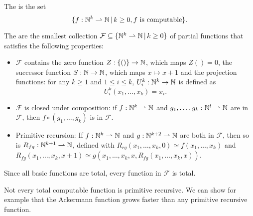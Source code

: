 
\begin{definition}
  The  is the set
  \[
	\{f: \mathbb{N}^k \rightharpoonup \mathbb{N} \,|\, k \ge 0, \text{$f$ is computable}\}.
  \]
\end{definition}

\begin{definition}
  The  are the smallest collection
  $\mathcal{F} \subseteq \{\mathbb{N}^k \rightharpoonup \mathbb{N} \,|\, k \ge 0\}$ of partial
  functions that satisfies the following properties:
  \begin{itemize}
  \item $\mathcal{F}$ contains the zero function $Z: \{()\} \to \mathbb{N}$,
	which maps $Z() = 0$, the successor function $S: \mathbb{N} \to \mathbb{N}$, which maps $x
	\mapsto x+1$ and the projection functions:
	for any $k \ge 1$ and $1 \le i \le k$, $U_i^k: \mathbb{N}^k \to \mathbb{N}$ is defined as
	\[
	  U_i^k(x_1, \ldots, x_k) = x_i.
	\]
  \item $\mathcal{F}$ is closed under composition: if $f: \mathbb{N}^k \rightharpoonup
	\mathbb{N}$ and $g_1, \ldots, g_k: \mathbb{N}^l \rightharpoonup \mathbb{N}$ are in $\mathcal{F}$,
	then $f \circ (g_1, \ldots, g_k)$ is in $\mathcal{F}$.
  \item Primitive recursion: If $f: \mathbb{N}^k \rightharpoonup \mathbb{N}$ and $g: \mathbb{N}^{k+2}
	\rightharpoonup \mathbb{N}$ are both in $\mathcal{F}$, then so is $R_{fg}: \mathbb{N}^{k+1}
	\rightharpoonup \mathbb{N}$, defined with $R_{rg}(x_1, \ldots, x_k, 0) \simeq f(x_1,
	\ldots, x_k)$ and $R_{fg}(x_1, \ldots, x_k, x+1) \simeq g(x_1, \ldots, x_k,
	x, R_{fg}(x_1, \ldots, x_k, x))$.
  \end{itemize}
\end{definition}

\begin{remark}
  Since all basic functions are total, every function in $\mathcal{F}$ is total.
\end{remark}

\begin{remark}
  Not every total computable function is primitive recursive.
  We can show for example that the Ackermann function grows faster than any
  primitive recursive function.
\end{remark}


